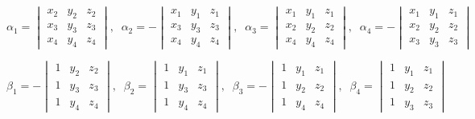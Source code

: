 \begin{equation}
{\alpha_{1}
=
\begin{vmatrix}
x_{2} & y_{2} & z_{2} \\
x_{3} & y_{3} & z_{3} \\
x_{4} & y_{4} & z_{4}
\end{vmatrix}},\;\;
{\alpha_{2}
= -
\begin{vmatrix}
x_{1} & y_{1} & z_{1} \\
x_{3} & y_{3} & z_{3} \\
x_{4} & y_{4} & z_{4}
\end{vmatrix}},\;\;
{\alpha_{3}
=
\begin{vmatrix}
x_{1} & y_{1} & z_{1} \\
x_{2} & y_{2} & z_{2} \\
x_{4} & y_{4} & z_{4}
\end{vmatrix}},\;\;
{\alpha_{4}
= -
\begin{vmatrix}
x_{1} & y_{1} & z_{1} \\
x_{2} & y_{2} & z_{2} \\
x_{3} & y_{3} & z_{3}
\end{vmatrix}}
\label{fig:alphacalc}
\end{equation}


\begin{equation}
{\beta_{1}
= -
\begin{vmatrix}
1 & y_{2} & z_{2} \\
1 & y_{3} & z_{3} \\
1 & y_{4} & z_{4}
\end{vmatrix}},\;\;
{\beta_{2}
=
\begin{vmatrix}
1 & y_{1} & z_{1} \\
1 & y_{3} & z_{3} \\
1 & y_{4} & z_{4}
\end{vmatrix}},\;\;
{\beta_{3}
= -
\begin{vmatrix}
1 & y_{1} & z_{1} \\
1 & y_{2} & z_{2} \\
1 & y_{4} & z_{4}
\end{vmatrix}},\;\;
{\beta_{4}
=
\begin{vmatrix}
1 & y_{1} & z_{1} \\
1 & y_{2} & z_{2} \\
1 & y_{3} & z_{3}
\end{vmatrix}}
\label{fig:betacalc}
\end{equation}

